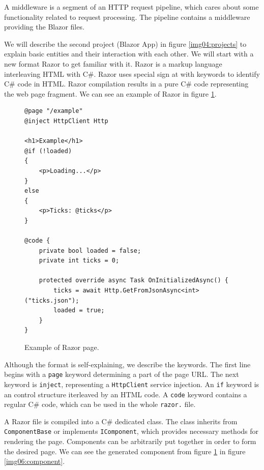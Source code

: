 A middleware is a segment of an HTTP request pipeline, which cares about some functionality related to request processing.
The pipeline contains a middleware providing the Blazor files.
\par
We will describe the second project (Blazor App) in figure \ref{img04:projects} to explain basic entities and their interaction with each other.
We will start with a new format Razor to get familiar with it.
Razor is a markup language interleaving HTML with C\#.
Razor uses special sign at with keywords to identify C\# code in HTML.
Razor compilation results in a pure C\# code representing the web page fragment.
We can see an example of Razor in figure \ref{img05:razor}.
\par
\begin{figure}
\begin{lstlisting}
@page "/example"
@inject HttpClient Http

<h1>Example</h1>
@if (!loaded)
{
    <p>Loading...</p>
}
else
{
    <p>Ticks: @ticks</p>
}

@code {
    private bool loaded = false;
    private int ticks = 0;

    protected override async Task OnInitializedAsync() {
        ticks = await Http.GetFromJsonAsync<int>("ticks.json");
        loaded = true;
    }
}
\end{lstlisting}
\caption{Example of Razor page.}
\label{img05:razor}
\end{figure}
\par
Although the format is self-explaining, we describe the keywords.
The first line begins with a \texttt{page} keyword determining a part of the page URL.
The next keyword is \texttt{inject}, representing a \texttt{HttpClient} service injection. 
An \texttt{if} keyword is an control structure iterleaved by an HTML code.
A \texttt{code} keyword contains a regular C\# code, which can be used in the whole \texttt{razor.} file.
\par
A Razor file is compiled into a C\# dedicated class.
The class inherits from \texttt{ComponentBase} or implements \texttt{IComponent}, which provides necessary methods for rendering the page.
Components can be arbitrarily put together in order to form the desired page.
We can see the generated component from figure \ref{img05:razor} in figure \ref{img06:component}.
\par
